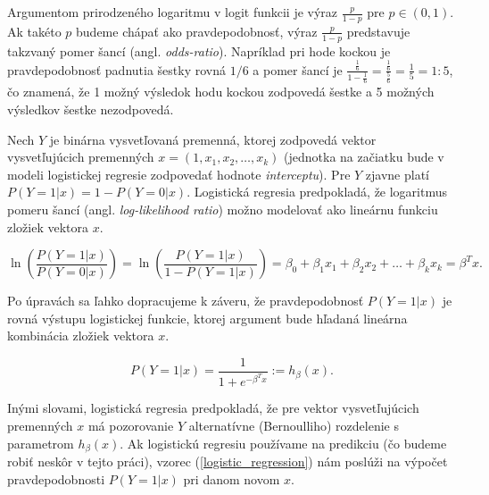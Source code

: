 \begin{center}
\end{center}

Argumentom prirodzeného logaritmu v logit funkcii je výraz \( \frac{p}{1 - p} \) pre \( p \in (0, 1) \).
Ak takéto \(p\) budeme chápať ako pravdepodobnosť, výraz \( \frac{p}{1 - p} \) predstavuje takzvaný pomer šancí (angl. \emph{odds-ratio}).
Napríklad pri hode kockou je pravdepodobnosť padnutia šestky rovná \( 1/6 \) a pomer šancí je \( \frac{\frac{1}{6}}{1 - \frac{1}{6}} = \frac{\frac{1}{6}}{\frac{5}{6}} = \frac{1}{5} = 1 : 5\),
čo znamená, že 1 možný výsledok hodu kockou zodpovedá šestke a 5 možných výsledkov šestke nezodpovedá.

Nech \( Y \) je binárna vysvetľovaná premenná, ktorej zodpovedá vektor vysvetľujúcich premenných \( x = (1, x_1, x_2, \ldots, x_k) \)
(jednotka na začiatku bude v modeli logistickej regresie zodpovedať hodnote \emph{interceptu}).
Pre \( Y \) zjavne platí \( P(Y = 1|x) = 1 - P(Y = 0|x) \).
Logistická regresia predpokladá, že logaritmus pomeru šancí (angl. \emph{log-likelihood ratio}) možno modelovať ako lineárnu funkciu zložiek vektora \( x \).

\[
\ln \left( \frac{P(Y = 1|x)}{P(Y = 0|x)} \right) = \ln \left( \frac{P(Y = 1|x)}{1 - P(Y = 1|x)} \right) = \beta_0 + \beta_1 x_1 + \beta_2 x_2 + \ldots + \beta_k x_k = \beta^T x.
\]

Po úpravách sa ľahko dopracujeme k záveru, že pravdepodobnosť \( P(Y = 1|x) \) je rovná výstupu logistickej funkcie, ktorej argument bude hľadaná lineárna kombinácia zložiek vektora \( x \).

\begin{equation} \label{logistic_regression}
P(Y = 1|x) = \frac{1}{1 + e^{-\beta^T x}} := h_\beta(x).
\end{equation}

Inými slovami, logistická regresia predpokladá, že pre vektor vysvetľujúcich premenných \(x\) má pozorovanie \(Y\)
alternatívne (Bernoulliho) rozdelenie s parametrom \(h_\beta(x)\).
Ak logistickú regresiu používame na predikciu (čo budeme robiť neskôr v tejto práci),
vzorec (\ref{logistic_regression}) nám poslúži na výpočet pravdepodobnosti \( P(Y = 1|x) \) pri danom novom \( x \).

